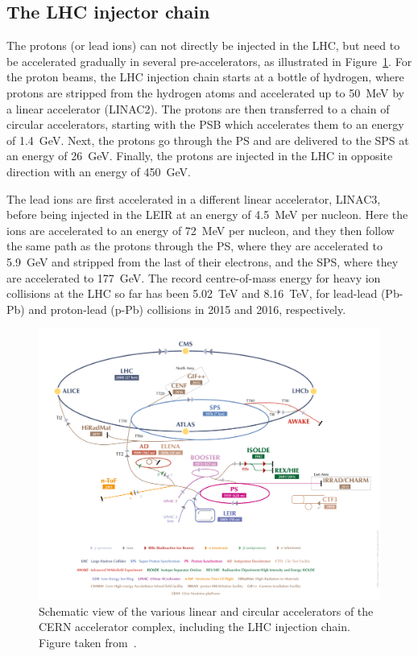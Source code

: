 \subsection{The LHC injector chain}

The protons (or lead ions) can not directly be injected in the \ac{LHC}, but need to be accelerated gradually in several pre-accelerators, as illustrated in Figure~\ref{fig:accelerators}. For the proton beams, the \ac{LHC} injection chain starts at a bottle of hydrogen, where protons are stripped from the hydrogen atoms and accelerated up to \SI{50}{MeV} by a linear accelerator (LINAC2). The protons are then transferred to a chain of circular accelerators, starting with the \ac{PSB} which accelerates them to an energy of \SI{1.4}{GeV}. Next, the protons go through the \ac{PS} and are delivered to the \ac{SPS} at an energy of \SI{26}{GeV}. Finally, the protons are injected in the \ac{LHC} in opposite direction with an energy of \SI{450}{GeV}. 

The lead ions are first accelerated in a different linear accelerator, LINAC3, before being injected in the \ac{LEIR} at an energy of \SI{4.5}{MeV} per nucleon. Here the ions are accelerated to an energy of \SI{72}{MeV} per nucleon, and they then follow the same path as the protons through the \ac{PS}, where they are accelerated to \SI{5.9}{GeV} and stripped from the last of their electrons, and the \ac{SPS}, where they are accelerated to \SI{177}{GeV}. The record centre-of-mass energy for heavy ion collisions at the \ac{LHC} so far has been \SI{5.02}{TeV} and \SI{8.16}{TeV}, for lead-lead (Pb-Pb) and proton-lead (p-Pb) collisions in 2015 and 2016, respectively.

\begin{figure}[ht]
  \centering
 \includegraphics[width=\textwidth]{lhc_complex.png}
 \caption{Schematic view of the various linear and circular accelerators of the \ac{CERN} accelerator complex, including the \ac{LHC} injection chain. Figure taken from~\cite{Mobs:2225847}.}
 \label{fig:accelerators}
\end{figure}

